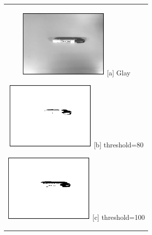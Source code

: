 \documentclass{suribt}
\begin{document}
\begin{figure} [htbp]
	\begin{center}
		\begin{tabular}{c}
		
		\begin{minipage}{0.33\hsize}
			\begin{center}
				\includegraphics[clip, width=4.5cm]{./figure/pen_glay.eps}
				\hspace{1.6cm} [a] Glay
			\end{center}
		\end{minipage}
		
		\begin{minipage}{0.33\hsize}
			\begin{center}
				\includegraphics[clip, width=4.5cm]{./figure/pen_thresh_80.eps}
				\hspace{1.6cm} [b] threshold=80
			\end{center}
		\end{minipage}
		
		\begin{minipage}{0.33\hsize}
			\begin{center}
				\includegraphics[clip, width=4.5cm]{./figure/pen_thresh_100.eps}
				\hspace{1.6cm} [c] threshold=100
			\end{center}
		\end{minipage} \\
		

\end{tabular}
\end{center}
\end{figure}
\end{document}
